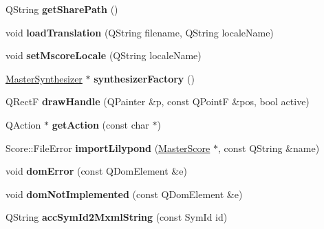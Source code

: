 \begin{DoxyCompactItemize}
\item 
\mbox{\label{namespace_ms_ab06eb03041a386b66a6dcb7f858294b6}} 
Q\+String {\bfseries get\+Share\+Path} ()
\item 
\mbox{\label{namespace_ms_aeaba95f21606e3a7a25dbdf2f92a1391}} 
void {\bfseries load\+Translation} (Q\+String filename, Q\+String locale\+Name)
\item 
\mbox{\label{namespace_ms_a981916df56ad9080d21fa000df97390e}} 
void {\bfseries set\+Mscore\+Locale} (Q\+String locale\+Name)
\item 
\mbox{\label{namespace_ms_a463a6d7e3bf053a648b899c8c1ba2621}} 
\hyperlink{class_ms_1_1_master_synthesizer}{Master\+Synthesizer} $\ast$ {\bfseries synthesizer\+Factory} ()
\item 
\mbox{\label{namespace_ms_a1f566bc5a26db034c377e662d44f7809}} 
Q\+RectF {\bfseries draw\+Handle} (Q\+Painter \&p, const Q\+PointF \&pos, bool active)
\item 
\mbox{\label{namespace_ms_ade5a93277df5cc945295bbffb6714055}} 
Q\+Action $\ast$ {\bfseries get\+Action} (const char $\ast$)
\item 
\mbox{\label{namespace_ms_aa22afc36d4e2eeeb4a087f514b7319c5}} 
Score\+::\+File\+Error {\bfseries import\+Lilypond} (\hyperlink{class_ms_1_1_master_score}{Master\+Score} $\ast$, const Q\+String \&name)
\item 
\mbox{\label{namespace_ms_a0128b0923142e1f05c0ba8c4b69e19f2}} 
void {\bfseries dom\+Error} (const Q\+Dom\+Element \&e)
\item 
\mbox{\label{namespace_ms_aaa9591db8a93564aa0d8bf399a459a4c}} 
void {\bfseries dom\+Not\+Implemented} (const Q\+Dom\+Element \&e)
\item 
\mbox{\label{namespace_ms_a198b197ccce17a58cb3a3a6e3a9466cb}} 
Q\+String {\bfseries acc\+Sym\+Id2\+Mxml\+String} (const Sym\+Id id)
\item 
\mbox{\label{namespace_ms_a9be8fd81493b2281804478958847ce95}} 

\end{DoxyCompactItemize}
